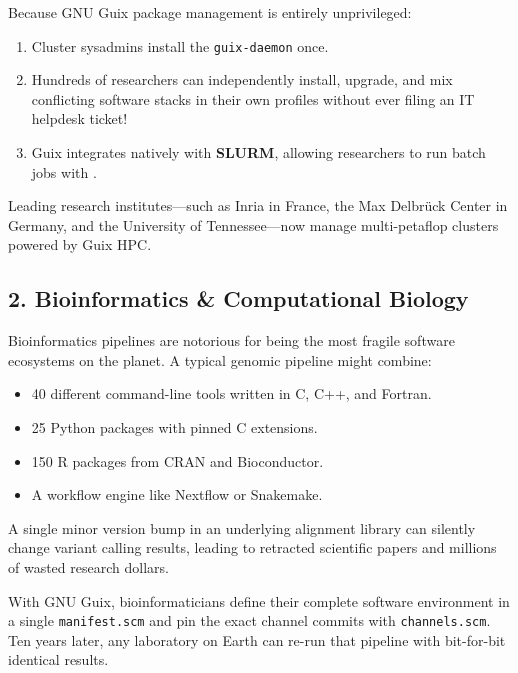 \begin{alchemybox}
Because GNU Guix package management is entirely unprivileged:
\begin{enumerate}
  \item Cluster sysadmins install the \texttt{guix-daemon} once.
  \item Hundreds of researchers can independently install, upgrade, and mix conflicting software stacks in their own profiles without ever filing an IT helpdesk ticket!
  \item Guix integrates natively with \textbf{SLURM}, allowing researchers to run batch jobs with .
\end{enumerate}
\end{alchemybox}

Leading research institutes---such as Inria in France, the Max Delbr\"uck Center in Germany, and the University of Tennessee---now manage multi-petaflop clusters powered by Guix HPC.

\subsection{2. Bioinformatics \& Computational Biology}

Bioinformatics pipelines are notorious for being the most fragile software ecosystems on the planet. A typical genomic pipeline might combine:
\begin{itemize}
  \item 40 different command-line tools written in C, C++, and Fortran.
  \item 25 Python packages with pinned C extensions.
  \item 150 R packages from CRAN and Bioconductor.
  \item A workflow engine like Nextflow or Snakemake.
\end{itemize}

A single minor version bump in an underlying alignment library can silently change variant calling results, leading to retracted scientific papers and millions of wasted research dollars.

With GNU Guix, bioinformaticians define their complete software environment in a single \texttt{manifest.scm} and pin the exact channel commits with \texttt{channels.scm}. Ten years later, any laboratory on Earth can re-run that pipeline with bit-for-bit identical results.

